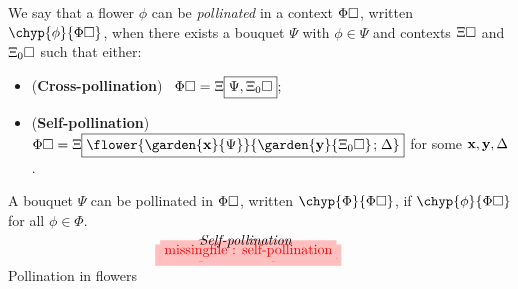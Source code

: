 \begin{definition}[Pollination]
  
  We say that a flower $\phi$ can be \emph{pollinated} in a context $\Phi\square$,
  written $\chyp{\phi}{\Phi\hole}$, when there exists a bouquet $\Psi$ with
  $\phi \in \Psi$ and contexts $\Xi\square$ and $\Xi_0\square$ such that either:
  \begin{itemize}
    \item (\textbf{Cross-pollination})~ $\Phi\square = \Xi\fbox{$\Psi,
    \Xi_0\square$}$;
    \item (\textbf{Self-pollination})~ $\Phi\hole =
    \cfill{\Xi}{\flower{\garden{\bx}{\Psi}}{\garden{\by}{\Xi_0\hole}
    \sep \Delta}}$ for some $\mathbf{x}, \mathbf{y}, \Delta$.
  \end{itemize}
  A bouquet $\Psi$ can be pollinated in $\Phi\square$, written
  $\chyp{\Phi}{\Phi\hole}$, if $\chyp{\phi}{\Phi\hole}$ for all $\phi \in \Phi$.
\end{definition}

\begin{marginfigure}
  $$
  \!\!\!\!
  \!\!\!\!
  \!\!\!\!
  \begin{array}{c}
    \tikzfig{1}{0.5}{cross-pollination} \vspace{-2em} \\
    \text{\textit{Cross-pollination}} \vspace{-1em} \\
    \tikzfig{1}{0.5}{self-pollination} \vspace{-2em} \\
    \text{\textit{Self-pollination}}
  \end{array}
  $$
  \caption{Pollination in flowers}
\end{marginfigure}

